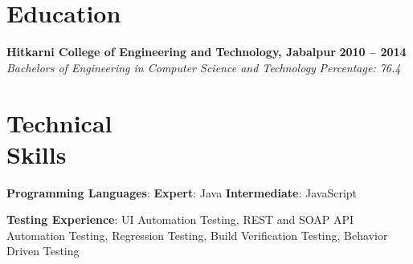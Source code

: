 \documentclass[margin,line]{resume}
\newcounter{dateone}
\newcounter{datetwo}
\newcommand{\difftoday}[3]{%
      \setmydatenumber{dateone}{\the\year}{\the\month}{\the\day}%
      \setmydatenumber{datetwo}{#1}{#2}{#3}%
      \addtocounter{datetwo}{-\thedateone}%
      \the\numexpr-\thedatetwo/365\relax\space year(s),
      \the\numexpr(-\thedatetwo - (-\thedatetwo/365)*365)/30\relax\space month(s)
}
\begin{document}
  \address{mobile: +91-9930145225 \\ email: yadavpriyta@gmail.com}
\begin{resume}


    \section{\mysidestyle Education}

    \textbf{Hitkarni College of Engineering and Technology, Jabalpur} \hfill \textbf{2010 -- 2014}\vspace{0mm}\\\vspace{0mm}%
    \textsl{Bachelors of Engineering in Computer Science and Technology} \hfill \textsl{Percentage: 76.4}
    \section{\mysidestyle Technical \\ Skills}
    \vspace{0mm}
     \textbf{Programming Languages}: \textbf{Expert}: Java \textbf{Intermediate}: JavaScript
     
     \textbf{Testing Experience}: UI Automation Testing, REST and SOAP API Automation Testing, Regression Testing, Build Verification Testing, Behavior Driven Testing
      

\end{resume}
\end{document}
